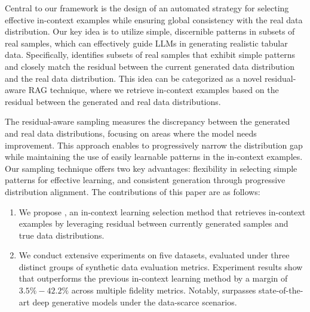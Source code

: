 Central to our framework is the design of an automated strategy for selecting effective in-context examples while ensuring global consistency with the real data distribution. Our key idea is to utilize simple, discernible patterns in subsets of real samples, which can effectively guide LLMs in generating realistic tabular data. Specifically, \modelname identifies subsets of real samples that exhibit simple patterns and closely match the residual between the current generated data distribution and the real data distribution. This idea can be categorized as a novel residual-aware RAG technique, where we retrieve in-context examples based on the residual between the generated and real data distributions.

The residual-aware sampling measures the discrepancy between the generated and real data distributions, focusing on areas where the model needs improvement. This approach enables \modelname to progressively narrow the distribution gap while maintaining the use of easily learnable patterns in the in-context examples. Our sampling technique offers two key advantages: flexibility in selecting simple patterns for effective learning, and consistent generation through progressive distribution alignment. The contributions of this paper are as follows:
\begin{enumerate}[leftmargin=*]
    \item We propose \modelname, an in-context learning selection method that retrieves in-context examples by leveraging residual between currently generated samples and true data distributions.
    
    \item We conduct extensive experiments on five datasets, evaluated under three distinct groups of synthetic data evaluation metrics. Experiment results show that \modelname outperforms the previous in-context learning method by a margin of $3.5\%-42.2\%$ across multiple fidelity metrics. Notably, \modelname surpasses state-of-the-art deep generative models under the data-scarce scenarios.
\end{enumerate}


